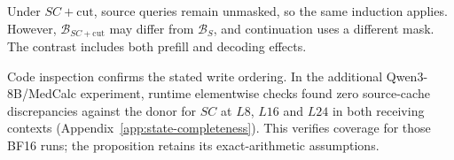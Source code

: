 Under $SC+\mathrm{cut}$, source queries remain unmasked, so the same
induction applies. However, $\mathcal B_{SC+\mathrm{cut}}$ may differ
from $\mathcal B_S$, and continuation uses a different mask. The contrast
includes both prefill and decoding effects.

Code inspection confirms the stated write ordering. In the additional
Qwen3-8B/MedCalc experiment, runtime elementwise checks found zero
source-cache discrepancies against the donor for $SC$ at $L8$, $L16$
and $L24$ in both receiving contexts
(Appendix~\ref{app:state-completeness}). This verifies coverage for those
BF16 runs; the proposition retains its exact-arithmetic assumptions.


